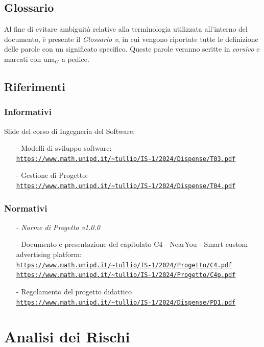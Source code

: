 \documentclass[12pt]{article}
\begin{document}
\subsection{Glossario}
Al fine di evitare ambiguità relative alla terminologia utilizzata all'interno del documento, è presente il \textit{Glossario v}, in cui vengono riportate tutte le definizione delle parole con un significato specifico. Queste parole veranno scritte in \textit{corsivo} e marcati con una$_G$ a pedice. 
\subsection{Riferimenti}
\subsubsection{Informativi}
Slide del corso di Ingegneria del Software:
\begin{itemize}
  \item [-] Modelli di sviluppo software:\\ \textcolor{blue}{\texttt{\url{https://www.math.unipd.it/~tullio/IS-1/2024/Dispense/T03.pdf}}}
    \item [-] Gestione di Progetto:\\ \textcolor{blue}{\texttt{\url{https://www.math.unipd.it/~tullio/IS-1/2024/Dispense/T04.pdf}}}
\end{itemize}

\subsubsection{Normativi}
\begin{itemize}
	\item [-] \textit{Norme di Progetto v1.0.0}
    \item [-] Documento e presentazione del capitolato C4 - NearYou - Smart custom advertising platform:\\
    \textcolor{blue}{\texttt{\url{https://www.math.unipd.it/~tullio/IS-1/2024/Progetto/C4.pdf}}}\\
    \textcolor{blue}{\texttt{\url{https://www.math.unipd.it/~tullio/IS-1/2024/Progetto/C4p.pdf}}}
    
    \item [-] Regolamento del progetto didattico\\ \textcolor{blue}{\texttt{\url{https://www.math.unipd.it/~tullio/IS-1/2024/Dispense/PD1.pdf}}}
\end{itemize}
\newpage
\section{Analisi dei Rischi}
\newpage
\end{document}
